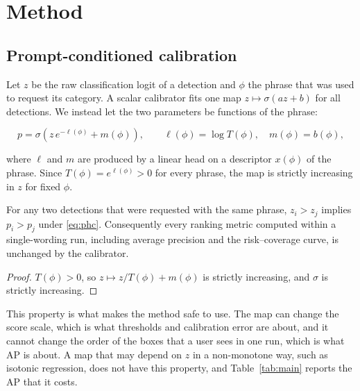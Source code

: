 \section{Method}\label{sec:method}

\subsection{Prompt-conditioned calibration}

Let $z$ be the raw classification logit of a detection and $\phi$ the phrase that was used to
request its category. A scalar calibrator fits one map $z\mapsto\sigma(az+b)$ for all
detections. We instead let the two parameters be functions of the phrase:

\begin{equation}\label{eq:phc}
p = \sigma\!\left(z\,e^{-\ell(\phi)} + m(\phi)\right),
\qquad
\ell(\phi) = \log T(\phi),\quad m(\phi) = b(\phi),
\end{equation}

where $\ell$ and $m$ are produced by a linear head on a descriptor $x(\phi)$ of the phrase.
Since $T(\phi)=e^{\ell(\phi)}>0$ for every phrase, the map is strictly increasing in $z$ for
fixed $\phi$.

\begin{proposition}\label{prop:mono}
For any two detections that were requested with the same phrase, $z_i>z_j$ implies
$p_i>p_j$ under \eqref{eq:phc}. Consequently every ranking metric computed within a
single-wording run, including average precision and the risk--coverage curve, is unchanged by
the calibrator.
\end{proposition}

\begin{proof}
$T(\phi)>0$, so $z\mapsto z/T(\phi)+m(\phi)$ is strictly increasing, and $\sigma$ is strictly
increasing.
\end{proof}

This property is what makes the method safe to use. The map can change the score scale, which
is what thresholds and calibration error are about, and it cannot change the order of the boxes
that a user sees in one run, which is what AP is about. A map that may depend on $z$ in a
non-monotone way, such as isotonic regression, does not have this property, and
Table~\ref{tab:main} reports the AP that it costs.

